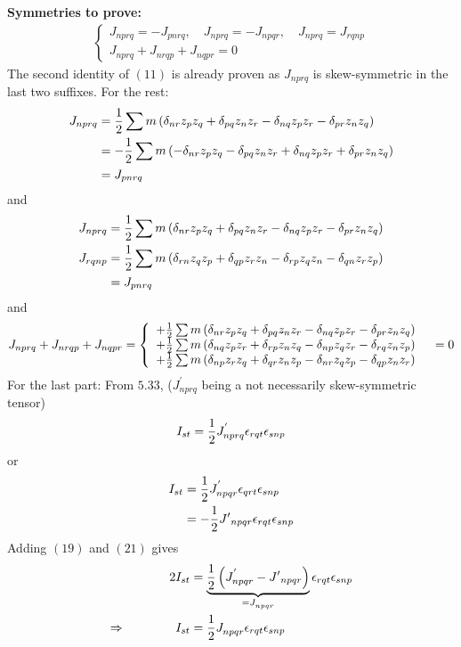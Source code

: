 \textbf{Symmetries to prove:}
\begin{align}
\left\{\begin{array}{l}
J_{nprq} = -J_{pnrq}, \quad J_{nprq} = -J_{npqr},\quad J_{nprq} = J_{rqnp}\\
J_{nprq}+J_{nrqp}+J_{nqpr}=0
\end{array}\right.
\end{align}
The second identity of $(11)$ is already proven as $J_{nprq}$ is skew-symmetric in the last two suffixes. For the rest:
\begin{align}
J_{nprq}&= \frac{1}{2}\sum m \left(\delta_{nr}z_pz_q +\delta_{pq}z_nz_r-\delta_{nq}z_pz_r-\delta_{pr}z_nz_q \right)\\
&=- \frac{1}{2}\sum m \left(-\delta_{nr}z_pz_q -\delta_{pq}z_nz_r+\delta_{nq}z_pz_r+\delta_{pr}z_nz_q \right)\\
&= J_{pnrq}
\end{align}
and
\begin{align}
J_{nprq}&= \frac{1}{2}\sum m \left(\delta_{nr}z_pz_q +\delta_{pq}z_nz_r-\delta_{nq}z_pz_r-\delta_{pr}z_nz_q \right)\\
J_{rqnp}&= \frac{1}{2}\sum m \left(\delta_{rn}z_qz_p +\delta_{qp}z_rz_n-\delta_{rp}z_qz_n-\delta_{qn}z_rz_p \right)\\
&= J_{pnrq}
\end{align}
and
\begin{align}
J_{nprq}+J_{nrqp}+J_{nqpr}&=\left\{\begin{array}{l}
+\frac{1}{2}\sum m \left(\delta_{nr}z_pz_q +\delta_{pq}z_nz_r-\delta_{nq}z_pz_r-\delta_{pr}z_nz_q \right)\\
+\frac{1}{2}\sum m \left(\delta_{nq}z_pz_r +\delta_{rp}z_nz_q-\delta_{np}z_qz_r-\delta_{rq}z_nz_p \right)\\
+\frac{1}{2}\sum m \left(\delta_{np}z_rz_q +\delta_{qr}z_nz_p-\delta_{nr}z_qz_p-\delta_{qp}z_nz_r \right)
\end{array}\right.
&=0
\end{align}
For the last part:
From $\mathbf{5.33}$,  ($J^{'}_{nprq}$ being a not necessarily skew-symmetric tensor)
\begin{align}
I_{st} = \frac{1}{2} J^{'}_{nprq} \epsilon_{rqt}\epsilon_{snp}
\end{align}
or 
\begin{align}
I_{st} &= \frac{1}{2} J^{'}_{npqr} \epsilon_{qrt}\epsilon_{snp}\\
&= -\frac{1}{2} J{'}_{npqr} \epsilon_{rqt}\epsilon_{snp}
\end{align}
Adding $(19)$ and $(21)$ gives
\begin{align}
2I_{st} &= \underbrace{\frac{1}{2} \left(J^{'}_{npqr} - J{'}_{npqr} \right)}_{= J^{}_{npqr}}\epsilon_{rqt}\epsilon_{snp}\\
\Rightarrow\quad\quad\quad\quad I_{st} &=\frac{1}{2} J^{}_{npqr}\epsilon_{rqt}\epsilon_{snp}\
\end{align}
